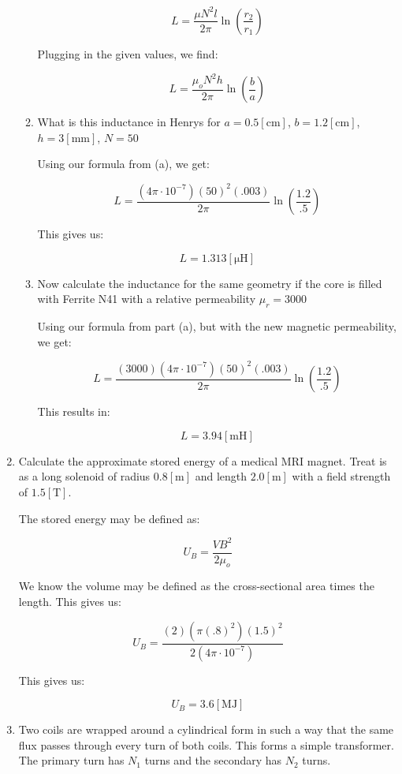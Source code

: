 \begin{enumerate}
\begin{enumerate}
        $$L=\frac{\mu N^2l}{2\pi}\ln\left( \frac{r_2}{r_1} \right)$$

        Plugging in the given values, we find:

        $$\boxed{L=\frac{\mu_oN^2h}{2\pi}\ln\left( \frac{b}{a} \right)}$$

      \item What is this inductance in Henrys for $a=0.5[\si{\centi\meter}]$, $b=1.2[\si{\centi\meter}]$, $h=3[\si{\milli\meter}]$, $N=50$

        Using our formula from (a), we get:

        $$L=\frac{(4\pi\cdot10^{-7})(50)^2(.003)}{2\pi}\ln\left( \frac{1.2}{.5} \right)$$

        This gives us:

        $$\boxed{L=1.313\left[ \si{\micro\henry} \right]}$$

      \item Now calculate the inductance for the same geometry if the core is filled with Ferrite N41 with a relative permeability $\mu_r=3000$

        Using our formula from part (a), but with the new magnetic permeability, we get:

        $$L=\frac{(3000)(4\pi\cdot10^{-7})(50)^2(.003)}{2\pi}\ln\left( \frac{1.2}{.5} \right)$$

        This results in:

        $$\boxed{L=3.94[\si{\milli\henry}]}$$

    \end{enumerate}

  \item Calculate the approximate stored energy of a medical MRI magnet. Treat is as a long solenoid of radius $0.8[\si{\meter}]$ and length $2.0[\si{\meter}]$ with a field strength of $1.5[\si{\tesla}]$.
    
    The stored energy may be defined as:

    $$U_B=\frac{VB^2}{2\mu_o}$$

    We know the volume may be defined as the cross-sectional area times the length. This gives us:

    $$U_B=\frac{(2)(\pi(.8)^2)(1.5)^2}{2(4\pi\cdot10^{-7})}$$

    This gives us:

    $$\boxed{U_B=3.6[\si{\mega\joule}]}$$

  \item Two coils are wrapped around a cylindrical form in such a way that the same flux passes through every turn of both coils. This forms a simple transformer. The primary turn has $N_1$ turns and the secondary has $N_2$ turns.


\end{enumerate}
